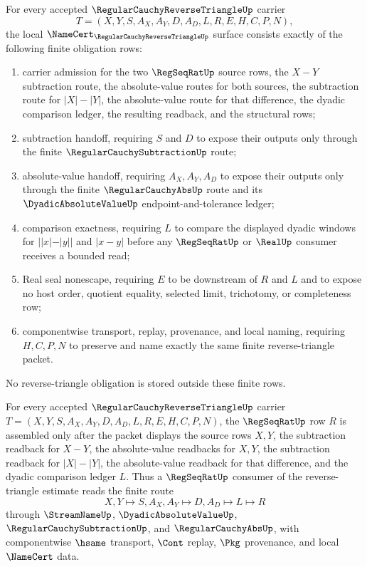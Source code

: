 \begin{theorem}
\label{thm:regular-cauchy-reverse-triangle-namecert-obligations}
For every accepted $\RegularCauchyReverseTriangleUp$ carrier
$$
T=(X,Y,S,A_X,A_Y,D,A_D,L,R,E,H,C,P,N),
$$
the local $\NameCert_{\RegularCauchyReverseTriangleUp}$ surface consists exactly of the following finite obligation rows:
\begin{enumerate}
\item carrier admission for the two $\RegSeqRatUp$ source rows, the $X-Y$ subtraction route, the absolute-value routes for both sources, the subtraction route for $|X|-|Y|$, the absolute-value route for that difference, the dyadic comparison ledger, the resulting readback, and the structural rows;
\item subtraction handoff, requiring $S$ and $D$ to expose their outputs only through the finite $\RegularCauchySubtractionUp$ route;
\item absolute-value handoff, requiring $A_X,A_Y,A_D$ to expose their outputs only through the finite $\RegularCauchyAbsUp$ route and its $\DyadicAbsoluteValueUp$ endpoint-and-tolerance ledger;
\item comparison exactness, requiring $L$ to compare the displayed dyadic windows for $||x|-|y||$ and $|x-y|$ before any $\RegSeqRatUp$ or $\RealUp$ consumer receives a bounded read;
\item Real seal nonescape, requiring $E$ to be downstream of $R$ and $L$ and to expose no host order, quotient equality, selected limit, trichotomy, or completeness row;
\item componentwise transport, replay, provenance, and local naming, requiring $H,C,P,N$ to preserve and name exactly the same finite reverse-triangle packet.
\end{enumerate}
No reverse-triangle obligation is stored outside these finite rows.
\end{theorem}

\begin{theorem}
\label{thm:regular-cauchy-reverse-triangle-regseqrat-handoff}
For every accepted $\RegularCauchyReverseTriangleUp$ carrier $T=(X,Y,S,A_X,A_Y,D,A_D,L,R,E,H,C,P,N)$, the $\RegSeqRatUp$ row $R$ is assembled only after the packet displays the source rows $X,Y$, the subtraction readback for $X-Y$, the absolute-value readbacks for $X,Y$, the subtraction readback for $|X|-|Y|$, the absolute-value readback for that difference, and the dyadic comparison ledger $L$. Thus a $\RegSeqRatUp$ consumer of the reverse-triangle estimate reads the finite route
$$
X,Y \longmapsto S,A_X,A_Y \longmapsto D,A_D \longmapsto L \longmapsto R
$$
through $\StreamNameUp$, $\DyadicAbsoluteValueUp$, $\RegularCauchySubtractionUp$, and $\RegularCauchyAbsUp$, with componentwise $\hsame$ transport, $\Cont$ replay, $\Pkg$ provenance, and local $\NameCert$ data.
\end{theorem}

